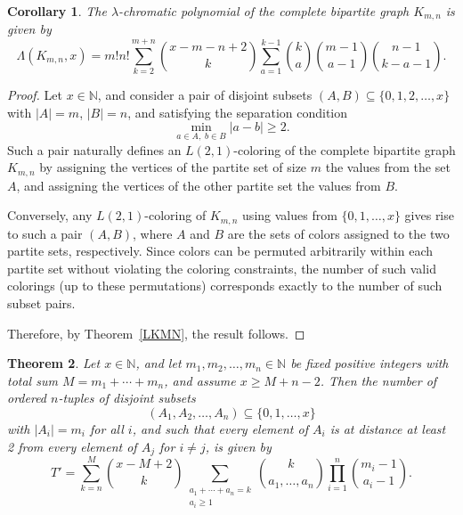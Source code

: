 \documentclass{birkjour}
\newtheorem{theorem}{Theorem}[section]
\newtheorem{Corollary}[theorem]{Corollary}
\theoremstyle{definition}
\theoremstyle{remark}
\numberwithin{equation}{section}
\begin{document}
\begin{Corollary}
\label{CKMN}
The $\lambda$-chromatic polynomial of the complete bipartite graph $K_{m,n}$ is given by 
\[ 
\Lambda(K_{m,n},x)= m!n!\sum_{k=2}^{m+n} \binom{x - m - n + 2}{k} \sum_{a=1}^{k-1} \binom{k}{a} \binom{m - 1}{a - 1} \binom{n - 1}{k - a - 1}.
\]
\end{Corollary}

\begin{proof}
Let \( x \in \mathbb{N} \), and consider a pair of disjoint subsets \( (A, B) \subseteq \{0, 1, 2, \dots, x\} \) with \( |A| = m \), \( |B| = n \), and satisfying the separation condition
\[
\min_{a \in A,\; b \in B} |a - b| \geq 2.
\]
Such a pair naturally defines an \( L(2,1) \)-coloring of the complete bipartite graph \( K_{m,n} \) by assigning the vertices of the partite set of size \( m \) the values from the set \( A \), and assigning the vertices of the other partite set the values from \( B \). 

Conversely, any \( L(2,1) \)-coloring of \( K_{m,n} \) using values from \( \{0,1,\dots,x\} \) gives rise to such a pair \( (A, B) \), where \( A \) and \( B \) are the sets of colors assigned to the two partite sets, respectively. Since colors can be permuted arbitrarily within each partite set without violating the coloring constraints, the number of such valid colorings (up to these permutations) corresponds exactly to the number of such subset pairs.

Therefore, by Theorem~\ref{LKMN}, the result follows.
\end{proof}

\begin{theorem}
\label{LCBG}
Let \( x \in \mathbb{N} \), and let \( m_1, m_2, \dots, m_n \in \mathbb{N} \) be fixed positive integers with total sum \( M = m_1 + \cdots + m_n \), and assume \( x \ge M + n - 2 \). Then the number of ordered \( n \)-tuples of disjoint subsets
\[
(A_1, A_2, \dots, A_n) \subseteq \{0, 1, \dots, x\}
\]
with \( |A_i| = m_i \) for all \( i \), and such that every element of \( A_i \) is at distance at least 2 from every element of \( A_j \) for \( i \ne j \), is given by
\[
T' = \sum_{k = n}^{M} \binom{x - M + 2}{k}
\sum_{\substack{a_1 + \cdots + a_n = k \\ a_i \ge 1}} 
\binom{k}{a_1, \dots, a_n}
\prod_{i = 1}^{n} \binom{m_i - 1}{a_i - 1}.
\]
\end{theorem}
\end{document}
